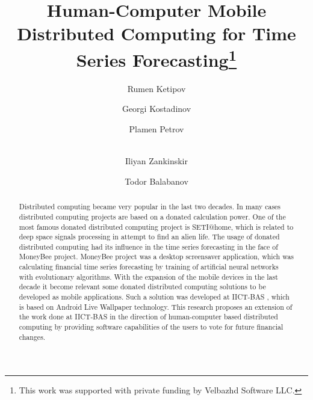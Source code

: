 \documentclass[runningheads]{llncs}
\begin{document}
\title{Human-Computer Mobile Distributed Computing for Time Series Forecasting\thanks{This work was supported with private funding by Velbazhd Software LLC.}}

\author{
	Rumen Ketipov \and
	Georgi Kostadinov \and
	Plamen Petrov \and \\
	Iliyan Zankinskir \and
	Todor Balabanov
}



\maketitle

\begin{abstract}
Distributed computing became very popular in the last two decades. In many cases distributed computing projects are based on a donated calculation power. One of the most famous donated distributed computing project is SETI@home, which is related to deep space signals processing in attempt to find an alien life. The usage of donated distributed computing had its influence in the time series forecasting in the face of MoneyBee \cite{bohn01} project. MoneyBee project was a desktop screensaver application, which was calculating financial time series forecasting by training of artificial neural networks with evolutionary algorithms. With the expansion of the mobile devices in the last decade it become relevant some donated distributed computing solutions to be developed as mobile applications. Such a solution was developed at IICT-BAS \cite{tomov01}, which is based on Android Live Wallpaper technology. This research proposes an extension of the work done at IICT-BAS in the direction of human-computer based distributed computing by providing software capabilities of the users to vote for future financial changes. 

\end{abstract}
\end{document}
